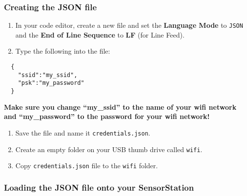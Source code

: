 \documentclass[
]{article}
\providecommand{\tightlist}{%
  \setlength{\itemsep}{0pt}\setlength{\parskip}{0pt}}
\begin{document}
\hypertarget{creating-the-json-file}{%
\subsubsection{Creating the JSON file}\label{creating-the-json-file}}

\begin{enumerate}
\def\labelenumi{\arabic{enumi}.}
\tightlist
\item
  In your code editor, create a new file and set the \textbf{Language
  Mode} to \texttt{JSON} and the \textbf{End of Line Sequence} to
  \textbf{LF} (for Line Feed).
\item
  Type the following into the file:
\end{enumerate}

\begin{verbatim}
  {
    "ssid":"my_ssid",
    "psk":"my_password" 
  }
\end{verbatim}

\textbf{Make sure you change ``my\_ssid'' to the name of your wifi
network and ``my\_password'' to the password for your wifi network!}

\begin{enumerate}
\def\labelenumi{\arabic{enumi}.}
\setcounter{enumi}{2}
\tightlist
\item
  Save the file and name it \texttt{credentials.json}.
\item
  Create an empty folder on your USB thumb drive called \texttt{wifi}.
\item
  Copy \texttt{credentials.json} file to the \texttt{wifi} folder.
\end{enumerate}

\hypertarget{loading-the-json-file-onto-your-sensorstation}{%
\subsubsection{Loading the JSON file onto your
SensorStation}\label{loading-the-json-file-onto-your-sensorstation}}
\end{document}
